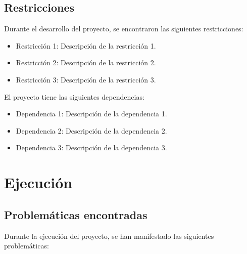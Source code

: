 \documentclass{article}
\begin{document}
\subsection{Restricciones}
Durante el desarrollo del proyecto, se encontraron las siguientes restricciones:
\begin{itemize}
  \item Restricción 1: Descripción de la restricción 1.
  \item Restricción 2: Descripción de la restricción 2.
  \item Restricción 3: Descripción de la restricción 3.
\end{itemize}

El proyecto tiene las siguientes dependencias:
\begin{itemize}
  \item Dependencia 1: Descripción de la dependencia 1.
  \item Dependencia 2: Descripción de la dependencia 2.
  \item Dependencia 3: Descripción de la dependencia 3.
\end{itemize}


\section{Ejecución}

\subsection{Problemáticas encontradas}
Durante la ejecución del proyecto, se han manifestado las siguientes problemáticas:
\end{document}
